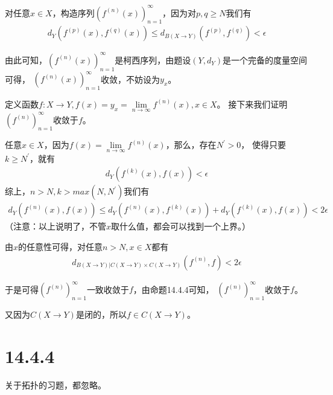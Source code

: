 \documentclass{article}
\begin{document}
对任意$x \in X$，构造序列$(f^{(n)}(x))_{n = 1}^\infty$，因为对$p,q \geq N$我们有
\begin{align*}
  d_Y(f^{(p)}(x), f^{(q)}(x)) \leq d_{B(X \to Y)}(f^{(p)}, f^{(q)}) < \epsilon
\end{align*}

由此可知，$(f^{(n)}(x))_{n = 1}^\infty$是柯西序列，由题设$(Y,d_Y)$是一个完备的度量空间可得，
$(f^{(n)}(x))_{n = 1}^\infty$收敛，不妨设为$y_x$。

定义函数$f : X \to Y, f(x) = y_x = \lim\limits_{n \to \infty}f^{(n)}(x), x \in X$。
接下来我们证明$(f^{(n)})_{n = 1}^\infty$收敛于$f$。

任意$x \in X$，因为$f(x) = \lim\limits_{n \to \infty}f^{(n)}(x)$，那么，存在$N^\prime > 0$，
使得只要$k \geq N^\prime$，就有
\begin{align*}
  d_Y(f^{(k)}(x), f(x)) < \epsilon
\end{align*}
综上，$n > N, k > max(N, N^\prime)$我们有
\begin{align*}
  d_Y(f^{(n)}(x) ,f(x)) \leq d_Y(f^{(n)}(x), f^{(k)}(x)) + d_Y(f^{(k)}(x), f(x)) < 2\epsilon
\end{align*}
（注意：以上说明了，不管$x$取什么值，都会可以找到一个上界。）

由$x$的任意性可得，对任意$n > N, x \in X$都有
\begin{align*}
  d_{B(X \to Y)|C(X \to Y) \times C(X \to Y)}(f^{(n)}, f) < 2\epsilon 
\end{align*}

于是可得$(f^{(n)})_{n = 1}^\infty$一致收敛于$f$，由命题14.4.4可知，
$(f^{(n)})_{n = 1}^\infty$收敛于$f$。

又因为$C(X \to Y)$是闭的，所以$f \in C(X \to Y)$。

\section*{14.4.4}

关于拓扑的习题，都忽略。
\end{document}

